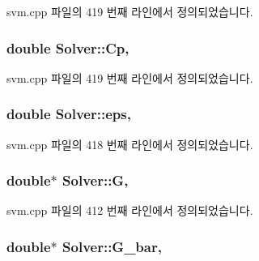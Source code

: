 svm.\+cpp 파일의 419 번째 라인에서 정의되었습니다.

\hypertarget{class_solver_a2e45dbea8be469bf8247e14768549dd5}{
\subsubsection[{Cp}]{\setlength{\rightskip}{0pt plus 5cm}double Solver\+::\+Cp\hspace{0.3cm}{\ttfamily [protected]}, {\ttfamily [inherited]}}}\label{class_solver_a2e45dbea8be469bf8247e14768549dd5}


svm.\+cpp 파일의 419 번째 라인에서 정의되었습니다.

\hypertarget{class_solver_a718333cc2c1d40abf9c292a788cba1e5}{
\subsubsection[{eps}]{\setlength{\rightskip}{0pt plus 5cm}double Solver\+::eps\hspace{0.3cm}{\ttfamily [protected]}, {\ttfamily [inherited]}}}\label{class_solver_a718333cc2c1d40abf9c292a788cba1e5}


svm.\+cpp 파일의 418 번째 라인에서 정의되었습니다.

\hypertarget{class_solver_ad8ab27068f2e045591970aae1201afe9}{
\subsubsection[{G}]{\setlength{\rightskip}{0pt plus 5cm}double$\ast$ Solver\+::\+G\hspace{0.3cm}{\ttfamily [protected]}, {\ttfamily [inherited]}}}\label{class_solver_ad8ab27068f2e045591970aae1201afe9}


svm.\+cpp 파일의 412 번째 라인에서 정의되었습니다.

\hypertarget{class_solver_a89e58cf39a0415c9032b8ec2f4575dcc}{
\subsubsection[{G\+\_\+bar}]{\setlength{\rightskip}{0pt plus 5cm}double$\ast$ Solver\+::\+G\+\_\+bar\hspace{0.3cm}{\ttfamily [protected]}, {\ttfamily [inherited]}}}\label{class_solver_a89e58cf39a0415c9032b8ec2f4575dcc}


